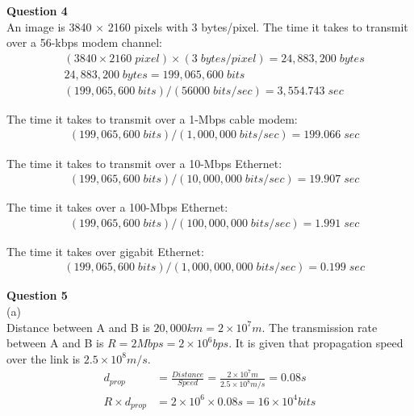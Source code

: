 \documentclass{article}
\begin{document}
{\bf Question 4}\\
An image is 3840 × 2160 pixels with 3 bytes/pixel. The time it takes to transmit over a 56-kbps modem channel:
\begin{equation*}
    \begin{split}
    & (3840\times2160\;pixel)\times(3\;bytes/pixel) =24,883,200\;bytes\\
    & 24,883,200\;bytes=199,065,600\;bits\\
    & (199,065,600\;bits) / (56000\;bits/sec) = 3,554.743\;sec
    \end{split}
\end{equation*}

The time it takes to transmit over a 1-Mbps cable modem:
\begin{equation*}
    \begin{split}
    & (199,065,600\;bits) / (1,000,000\;bits/sec) = 199.066\;sec
    \end{split}
\end{equation*}

The time it takes to transmit over a 10-Mbps Ethernet:
\begin{equation*}
    \begin{split}
    & (199,065,600\;bits) / (10,000,000\;bits/sec) = 19.907\;sec
    \end{split}
\end{equation*}

The time it takes over a 100-Mbps Ethernet:
\begin{equation*}
    \begin{split}
    & (199,065,600\;bits) / (100,000,000\;bits/sec) = 1.991\;sec
    \end{split}
\end{equation*}

The time it takes over gigabit Ethernet:
\begin{equation*}
    \begin{split}
    & (199,065,600\;bits) / (1,000,000,000\;bits/sec) = 0.199\;sec
    \end{split}
\end{equation*}

{\bf Question 5}\\
(a)\\
Distance between A and B is $20,000km = 2\times10^7m$. The transmission rate between A and B is $R=2Mbps=2\times10^6bps$. It is given that propagation speed over the link is $2.5\times10^8m/s$.\\
\begin{equation*}
    \begin{split}
    d_{prop} &= \frac {Distance}{Speed}=\frac{2\times10^7m}{2.5\times10^8m/s}=0.08s\\
    R \times d_{prop} &= 2\times10^6 \times 0.08s=16 \times 10^4bits
    \end{split}
\end{equation*}
\end{document}
